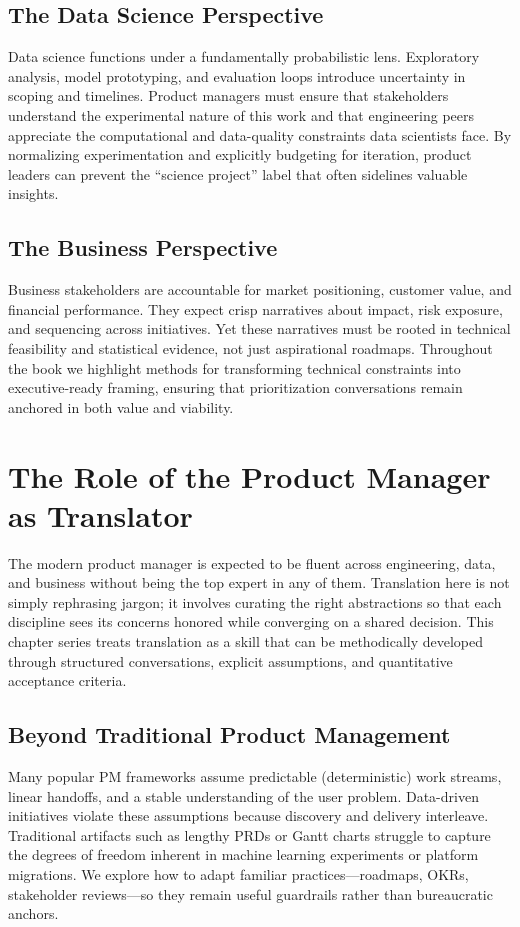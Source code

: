 \subsection{The Data Science Perspective}
Data science functions under a fundamentally probabilistic lens. Exploratory analysis, model prototyping, and evaluation loops introduce uncertainty in scoping and timelines. Product managers must ensure that stakeholders understand the experimental nature of this work and that engineering peers appreciate the computational and data-quality constraints data scientists face. By normalizing experimentation and explicitly budgeting for iteration, product leaders can prevent the ``science project'' label that often sidelines valuable insights.

\subsection{The Business Perspective}
Business stakeholders are accountable for market positioning, customer value, and financial performance. They expect crisp narratives about impact, risk exposure, and sequencing across initiatives. Yet these narratives must be rooted in technical feasibility and statistical evidence, not just aspirational roadmaps. Throughout the book we highlight methods for transforming technical constraints into executive-ready framing, ensuring that prioritization conversations remain anchored in both value and viability.

\section{The Role of the Product Manager as Translator}
\label{sec:pm-as-translator}

The modern product manager is expected to be fluent across engineering, data, and business without being the top expert in any of them. Translation here is not simply rephrasing jargon; it involves curating the right abstractions so that each discipline sees its concerns honored while converging on a shared decision. This chapter series treats translation as a skill that can be methodically developed through structured conversations, explicit assumptions, and quantitative acceptance criteria.

\subsection{Beyond Traditional Product Management}
Many popular PM frameworks assume predictable (\gls{deterministic}) work streams, linear handoffs, and a stable understanding of the user problem. Data-driven initiatives violate these assumptions because discovery and delivery interleave. Traditional artifacts such as lengthy PRDs or Gantt charts struggle to capture the degrees of freedom inherent in machine learning experiments or platform migrations. We explore how to adapt familiar practices—roadmaps, OKRs, stakeholder reviews—so they remain useful guardrails rather than bureaucratic anchors.

